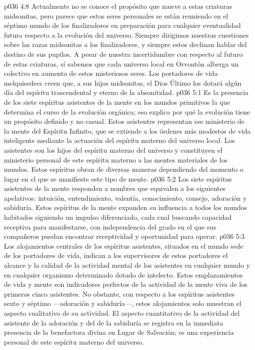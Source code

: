 \vs p036 4:8 \pc Actualmente no se conoce el propósito que mueve a estas criaturas midsonitas, pero parece que estos seres personales se están reuniendo en el séptimo mundo de los finalizadores en preparación para cualquier eventualidad futura respecto a la evolución del universo. Siempre dirigimos nuestras cuestiones sobre las razas midsonitas a los finalizadores, y siempre estos declinan hablar del destino de sus pupilos. A pesar de nuestra incertidumbre con respecto al futuro de estas criaturas, sí sabemos que cada universo local en Orvontón alberga un colectivo en aumento de estos misteriosos seres. Los portadores de vida melquisedecs creen que, a sus hijos midsonitas, el Dios Último los dotará algún día del espíritu trascendental y eterno de la absonitidad.
\vs p036 5:1 Es la presencia de los siete espíritus asistentes de la mente en los mundos primitivos la que determina el curso de la evolución orgánica; eso explica por qué la evolución tiene un propósito definido y no casual. Estos asistentes representan ese ministerio de la mente del Espíritu Infinito, que se extiende a los órdenes más modestos de vida inteligente mediante la actuación del espíritu materno del universo local. Los asistentes son los hijos del espíritu materno del universo y constituyen el ministerio personal de este espíritu materno a las mentes materiales de los mundos. Estos espíritus obran de diversas maneras dependiendo del momento o lugar en el que se manifieste este tipo de mente.
\vs p036 5:2 Los siete espíritus asistentes de la mente responden a nombres que equivalen a los siguientes apelativos: intuición, entendimiento, valentía, conocimiento, consejo, adoración y sabiduría. Estos espíritus de la mente expanden su influencia a todos los mundos habitados siguiendo un impulso diferenciado, cada cual buscando capacidad receptiva para manifestarse, con independencia del grado en el que sus compañeros puedan encontrar receptividad y oportunidad para operar.
\vs p036 5:3 Los alojamientos centrales de los espíritus asistentes, situados en el mundo sede de los portadores de vida, indican a los supervisores de estos portadores el alcance y la calidad de la actividad mental de los asistentes en cualquier mundo y en cualquier organismo determinado dotado de intelecto. Estos emplazamientos de vida y mente son indicadores perfectos de la actividad de la mente viva de los primeros cinco asistentes. No obstante, con respecto a los espíritus asistentes sexto y séptimo ---adoración y sabiduría---, estos alojamientos solo muestran el aspecto cualitativo de su actividad. El aspecto cuantitativo de la actividad del asistente de la adoración y del de la sabiduría se registra en la inmediata presencia de la benefactora divina en Lugar de Salvación; es una experiencia personal de este espíritu materno del universo.
